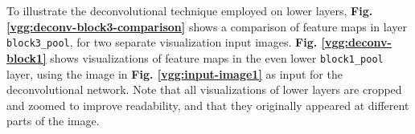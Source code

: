 \noindent To illustrate the deconvolutional technique employed on lower layers, \textbf{Fig. \ref{vgg:deconv-block3-comparison}} shows a comparison of feature maps in layer \texttt{block3\_pool}, for two separate visualization input images. \textbf{Fig. \ref{vgg:deconv-block1}} shows visualizations of feature maps in the even lower \texttt{block1\_pool} layer, using the image in \textbf{Fig. \ref{vgg:input-image1}} as input for the deconvolutional network. Note that all visualizations of lower layers are cropped and zoomed to improve readability, and that they originally appeared at different parts of the image. 

\begin{figure}
\captionsetup[subfigure]{labelformat=empty}
\begin{center}



\end{center}
\end{figure}
